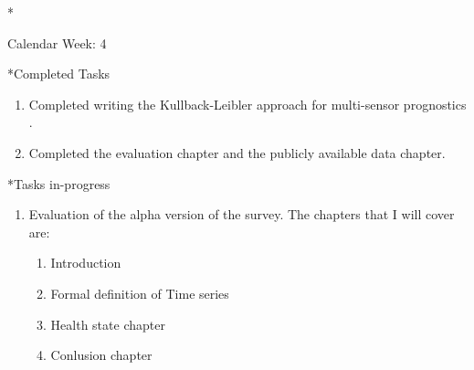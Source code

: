 \documentclass[11pt,a4paper]{article}
\begin{document}
\newpage
\begin{section}*{Calendar Week: 4  \hfill \date{29 January, 2021}}
 \begin{refsection}

       \begin{subsection}*{Completed Tasks}
             \begin{enumerate}
                   \item
                         Completed writing the Kullback-Leibler approach for multi-sensor prognostics \cite{DBLP:conf/indin/AremuOHM19}.
                   \item
                         Completed the evaluation chapter and the publicly available data chapter.
             \end{enumerate}
       \end{subsection}

       \begin{subsection}*{Tasks in-progress}
             \begin{enumerate}
                   \item
                         Evaluation of the alpha version of the survey. The chapters
                         that I will cover are:
                         \begin{enumerate}
                               \item Introduction
                               \item Formal definition of Time series
                               \item Health state chapter
                               \item Conlusion chapter
                         \end{enumerate}
             \end{enumerate}
       \end{subsection}

       \printbibliography
 \end{refsection}
\end{section}
\end{document}
